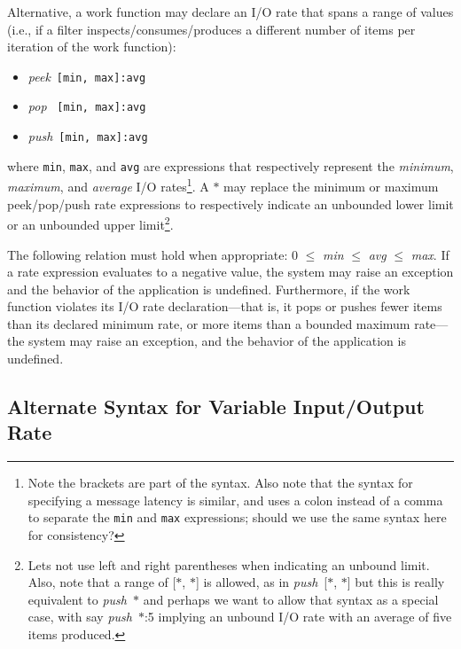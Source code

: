 \documentclass{tr}
\begin{document}
Alternative,  a work function  may declare  an I/O  rate that  spans a
range  of  values  (i.e.,  if a  filter  inspects/consumes/produces  a
different number of items per iteration of the work function):
\begin{itemize}
\item {\it peek}~\texttt{[min, max]:avg}
\item {\it pop }~\texttt{[min, max]:avg}
\item {\it push}~\texttt{[min, max]:avg}
\end{itemize}
where  \texttt{min}, \texttt{max},  and  \texttt{avg} are  expressions
that respectively represent the {\it minimum}, {\it maximum}, and {\it
average}  I/O  rates\footnote{Note  the   brackets  are  part  of  the
syntax. Also note that the  syntax for specifying a message latency is
similar,  and  uses  a  colon  instead  of a  comma  to  separate  the
\texttt{min}  and \texttt{max}  expressions;  should we  use the  same
syntax  here for  consistency?}.  A  $*$  may replace  the minimum  or
maximum  peek/pop/push rate  expressions to  respectively  indicate an
unbounded lower  limit or an  unbounded upper limit\footnote{Lets  not use
left and  right parentheses when  indicating an unbound  limit.  Also,
note that  a range of  [$*$, $*$] is  allowed, as in  {\it push}~[$*$,
$*$] but  this is really equivalent  to {\it push}~$*$  and perhaps we
want to allow that syntax as a special case, with say {\it push}~$*$:5
implying an unbound I/O rate with an average of five items produced.}.

The following relation  must hold when appropriate: 0  $\le$ {\it min}
$\le$ {\it avg}  $\le$ {\it max}. If a rate  expression evaluates to a
negative value, the system may  raise an exception and the behavior of
the  application  is undefined.   Furthermore,  if  the work  function
violates its I/O  rate declaration---that is, it pops  or pushes fewer
items than  its declared  minimum rate, or  more items than  a bounded
maximum rate---the system may raise  an exception, and the behavior of
the application is undefined.


\subsection{Alternate Syntax for Variable Input/Output Rate}
\end{document}
